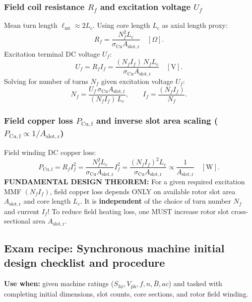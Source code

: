 \subsubsection{Field coil resistance $R_f$ and excitation voltage $U_f$}
Mean turn length $\ell_{\mathrm{mt}} \approx 2 L_c$. Using core length $L_c$ as axial length proxy:
\[
\boxed{R_f = \frac{N_f^2 L_c}{\sigma_{\mathrm{Cu}} A_{\mathrm{slot,r}}}}\quad[\Omega].
\]
Excitation terminal DC voltage $U_f$:
\[
\boxed{U_f = R_f I_f = \frac{(N_f I_f)\,N_f L_c}{\sigma_{\mathrm{Cu}} A_{\mathrm{slot,r}}}}\quad[\mathrm{V}].
\]
Solving for number of turns $N_f$ given excitation voltage $U_f$:
\[
\boxed{N_f = \frac{U_f\,\sigma_{\mathrm{Cu}} A_{\mathrm{slot,r}}}{(N_f I_f)\,L_c}},
\qquad
\boxed{I_f = \frac{(N_f I_f)}{N_f}}.
\]

\subsubsection{Field copper loss $P_{\mathrm{Cu,f}}$ and inverse slot area scaling ($P_{\mathrm{Cu,f}} \propto 1/A_{\mathrm{slot,r}}$)}
Field winding DC copper loss:
\[
\boxed{P_{\mathrm{Cu,f}} = R_f I_f^2 = \frac{N_f^2 L_c}{\sigma_{\mathrm{Cu}} A_{\mathrm{slot,r}}} I_f^2 = \frac{(N_f I_f)^2 L_c}{\sigma_{\mathrm{Cu}} A_{\mathrm{slot,r}}} \propto \frac{1}{A_{\mathrm{slot,r}}}}\quad[\mathrm{W}].
\]
\textbf{FUNDAMENTAL DESIGN THEOREM:}
For a given required excitation MMF $(N_f I_f)$, field copper loss depends ONLY on available rotor slot area $A_{\mathrm{slot,r}}$ and core length $L_c$. It is \textbf{independent} of the choice of turn number $N_f$ and current $I_f$!
To reduce field heating loss, one MUST increase rotor slot cross-sectional area $A_{\mathrm{slot,r}}$.

\subsection{Exam recipe: Synchronous machine initial design checklist and procedure}
\textbf{Use when:} given machine ratings ($S_{3\phi}, V_{\mathrm{ph}}, f, n, \bar{B}, ac$) and tasked with completing initial dimensions, slot counts, core sections, and rotor field winding.

